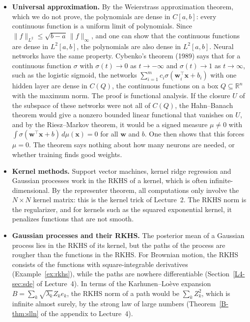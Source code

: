 \documentclass[11pt]{article}
\newcommand{\norm}[1]{\lVert #1 \rVert}
\theoremstyle{definition}
\theoremstyle{plain}
\theoremstyle{remark}
\begin{document}
\begin{itemize}
    \item \textbf{Universal approximation.} By the Weierstrass approximation theorem, which we do not prove, the polynomials are dense in $C[a, b]$: every continuous function is a uniform limit of polynomials. Since $\norm{f}_{L^2} \leq \sqrt{b - a}\,\norm{f}_\infty$, and one can show that the continuous functions are dense in $L^2[a, b]$, the polynomials are also dense in $L^2[a, b]$. Neural networks have the same property. Cybenko's theorem (1989) says that for a continuous function $\sigma$ with $\sigma(t) \to 0$ as $t \to -\infty$ and $\sigma(t) \to 1$ as $t \to \infty$, such as the logistic sigmoid, the networks $\sum_{i=1}^m c_i\sigma(\mathbf{w}_i^\top\mathbf{x} + b_i)$ with one hidden layer are dense in $C(Q)$, the continuous functions on a box $Q \subseteq \mathbb{R}^n$ with the maximum norm. The proof is functional analysis. If the closure $U$ of the subspace of these networks were not all of $C(Q)$, the Hahn--Banach theorem would give a nonzero bounded linear functional that vanishes on $U$, and by the Riesz--Markov theorem, it would be a signed measure $\mu \neq 0$ with $\int \sigma(\mathbf{w}^\top\mathbf{x} + b)\, d\mu(\mathbf{x}) = 0$ for all $\mathbf{w}$ and $b$. One then shows that this forces $\mu = 0$. The theorem says nothing about how many neurons are needed, or whether training finds good weights.
    \item \textbf{Kernel methods.} Support vector machines, kernel ridge regression and Gaussian processes work in the RKHS of a kernel, which is often infinite-dimensional. By the representer theorem, all computations only involve the $N \times N$ kernel matrix: this is the kernel trick of Lecture~2. The RKHS norm is the regularizer, and for kernels such as the squared exponential kernel, it penalizes functions that are not smooth.
    \item \textbf{Gaussian processes and their RKHS.} The posterior mean of a Gaussian process lies in the RKHS of its kernel, but the paths of the process are rougher than the functions in the RKHS. For Brownian motion, the RKHS consists of the functions with square-integrable derivatives (Example~\ref{ex:rkhs}), while the paths are nowhere differentiable (Section~\ref{L4-sec:sde} of Lecture~4). In terms of the Karhunen--Lo\`eve expansion $B = \sum_k \sqrt{\lambda_k}Z_ke_k$, the RKHS norm of a path would be $\sum_k Z_k^2$, which is infinite almost surely, by the strong law of large numbers (Theorem~\ref{B-thm:slln} of the appendix to Lecture~4).

\end{itemize}
\end{document}

